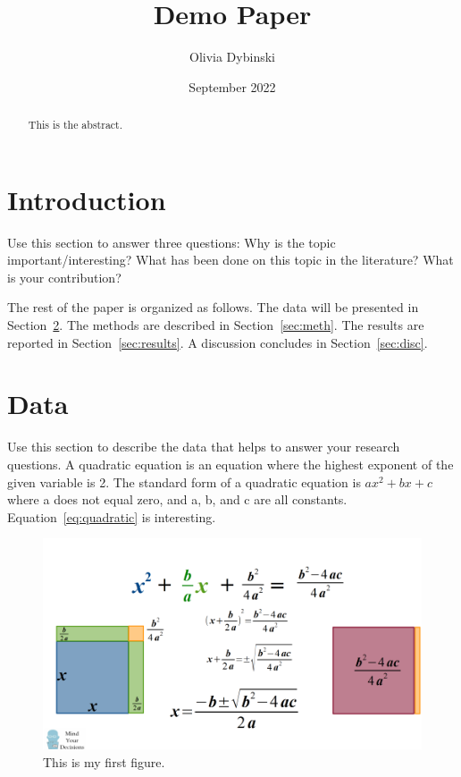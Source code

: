 \documentclass[12pt]{article}
\title{Demo Paper}
\author{Olivia Dybinski\\}
\date{September 2022}
\begin{document}
 \maketitle

 \begin{abstract}
This is the abstract. 
 \end{abstract}


 \section{Introduction} 
 \label{sec:intro}

 Use this section to answer three questions:
 Why is the topic important/interesting?
 What has been done on this topic in the literature?
 What is your contribution?


 The rest of the paper is organized as follows.
 The data will be presented in Section~\ref{sec:data}.
 The methods are described in Section~\ref{sec:meth}.
 The results are reported in Section~\ref{sec:results}.
 A discussion concludes in Section~\ref{sec:disc}.



 \section{Data}
 \label{sec:data}

 Use this section to describe the data that helps to answer your research questions.
 A quadratic equation is an equation where the highest exponent of the given variable is 2. The standard form of a quadratic equation is $ax^2 + bx +c$ where a does not equal zero, and a, b, and c are all constants. Equation~\eqref{eq:quadratic} is interesting. \citep{Dictionary}

 \begin{figure}[h!]
    \centering
    \includegraphics[width=10 cm]{quadraticform.png}
    \caption{This is my first figure.}
    \label{fig:Quadratic Formula}
  \end{figure}
\end{document}
